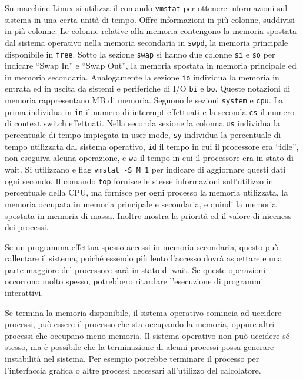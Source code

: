 \documentclass{article}
\numberwithin{equation}{subsection}
\begin{document}
Su macchine Linux si utilizza il comando \verb|vmstat| per ottenere informazioni sul sistema in una certa unità di tempo. Offre informazioni in più 
colonne, suddivisi in pià colonne. Le colonne relative alla memoria contengono la memoria spostata dal sistema operativo nella memoria secondaria in \verb|swpd|, la memoria principale 
disponibile in \verb|free|. Sotto la sezione \verb|swap| si hanno due colonne \verb|si| e \verb|so| per indicare ``Swap In'' e ``Swap Out'', la memoria spostata in memoria 
principale ed in memoria secondaria. Analogamente la sezione \verb|io| individua la memoria in entrata ed in uscita da sistemi e periferiche di I/O \verb|bi| e \verb|bo|. 
Queste notazioni di memoria rappresentano MB di memoria. Seguono le sezioni \verb|system| e \verb|cpu|. La prima individua in \verb|in| il numero di interrupt 
effettuati e la seconda \verb|cs| il numero di context switch effettuati. Nella seconda sezione la colonna \verb|us| individua la percentuale di tempo impiegata 
in user mode, \verb|sy| individua la percentuale di tempo utilizzata dal sistema operativo, \verb|id| il tempo in cui il processore era ``idle'', non eseguiva alcuna 
operazione, e \verb|wa| il tempo in cui il processore era in stato di wait. 
Si utilizzano e flag \verb|vmstat -S M 1| per indicare di aggiornare questi dati ogni secondo. Il comando \verb|top| fornisce le stesse informazioni sull'utilizzo in 
percentuale della CPU, ma fornisce per ogni processo la memoria utilizzata, la memoria occupata in memoria principale e secondaria, e quindi la memoria spostata 
in memoria di massa. Inoltre mostra la priorità ed il valore di niceness dei processi. 


Se un programma effettua spesso accessi in memoria secondaria, questo può rallentare il sistema, poiché essendo più lento l'accesso dovrà aspettare e una parte maggiore 
del processore sarà in stato di wait. Se queste operazioni occorrono molto spesso, potrebbero ritardare l'esecuzione di programmi interattivi. 

Se termina la memoria disponibile, il sistema operativo comincia ad uccidere processi, può essere il processo che sta occupando la memoria, oppure 
altri processi che occupano meno memoria. Il sistema operativo non può uccidere sé stesso, ma è possibile che la terminazione di alcuni processi 
possa generare instabilità nel sistema. Per esempio potrebbe terminare il processo per l'interfaccia grafica o altre processi necessari all'utilizzo del calcolatore. 
\end{document}
